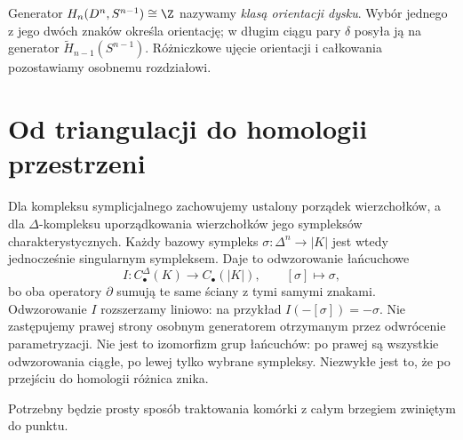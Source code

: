 \begin{uwaga}
Generator $H_n(D^n,S^{n-1})\cong\Z$
nazywamy \emph{klasą orientacji dysku}.
Wybór jednego z jego dwóch znaków
określa orientację; w długim ciągu
pary $\delta$ posyła ją na
generator $\widetilde H_{n-1}(S^{n-1})$.
Różniczkowe ujęcie orientacji
i całkowania pozostawiamy
osobnemu rozdziałowi.
\end{uwaga}

\section{Od triangulacji do homologii przestrzeni}
\label{sec:porownanie-symplicjalne}

Dla kompleksu symplicjalnego zachowujemy ustalony porządek
wierzchołków, a dla $\Delta$-kompleksu uporządkowania
wierzchołków jego sympleksów charakterystycznych.
Każdy bazowy sympleks $\sigma:\Delta^n\to|K|$ jest wtedy
jednocześnie singularnym sympleksem. Daje to odwzorowanie łańcuchowe
\[
 I:C_\bullet^\Delta(K)\longrightarrow C_\bullet(|K|),
 \qquad [\sigma]\longmapsto \sigma,
\]
bo oba operatory $\partial$ sumują te same
ściany z tymi samymi znakami.
Odwzorowanie $I$ rozszerzamy liniowo: na przykład $I(-[\sigma])=-\sigma$.
Nie zastępujemy prawej strony osobnym generatorem otrzymanym
przez odwrócenie parametryzacji. Nie jest to
izomorfizm grup łańcuchów: po prawej są
wszystkie odwzorowania ciągłe, po lewej tylko
wybrane sympleksy. Niezwykłe jest to,
że po przejściu do homologii różnica znika.

Potrzebny będzie prosty sposób traktowania
komórki z całym brzegiem zwiniętym do punktu.

